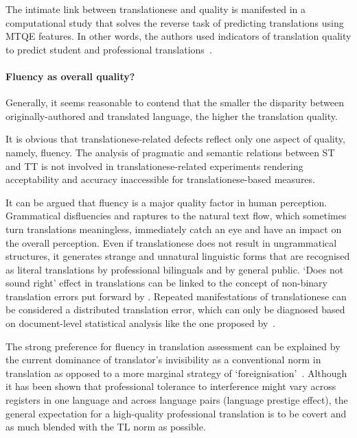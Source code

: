 The intimate link between translationese and quality is manifested in a computational study that solves the reverse task of predicting translations using \gls{MTQE} features. In other words, the authors used indicators of translation quality to predict student and professional translations~\cite{Rubino2016}.

\paragraph{Fluency as overall quality?}
Generally, it seems reasonable to contend that the smaller the disparity between originally-authored and translated language, the higher the translation quality.

It is obvious that translationese-related defects reflect only one aspect of quality, namely, fluency. The analysis of pragmatic and semantic relations between ST and TT is not involved in translationese-related experiments rendering acceptability and accuracy inaccessible for translationese-based measures.

It can be argued that fluency is a major quality factor in human perception. Grammatical disfluencies and raptures to the natural text flow, which sometimes turn translations meaningless, immediately catch an eye and have an impact on the overall perception. Even if translationese does not result in ungrammatical structures, it generates strange and unnatural linguistic forms that are recognised as literal translations by professional bilinguals and by general public. `Does not sound right' effect in translations can be linked to the concept of non-binary translation errors put forward by \citet{Pym1992}. Repeated manifestations of translationese can be considered a distributed translation error, which can only be diagnosed based on document-level statistical analysis like the one proposed by~\citet{Sutter2017}. 

The strong preference for fluency in translation assessment can be explained by the current dominance of translator's invisibility as a conventional norm in translation as opposed to a more marginal strategy of `foreignisation'~\cite{Venuti1995}. 
Although it has been shown that professional tolerance to interference might vary across registers in one language and across language pairs (language prestige effect), the general expectation for a high-quality professional translation is to be covert and as much blended with the TL norm as possible. 

